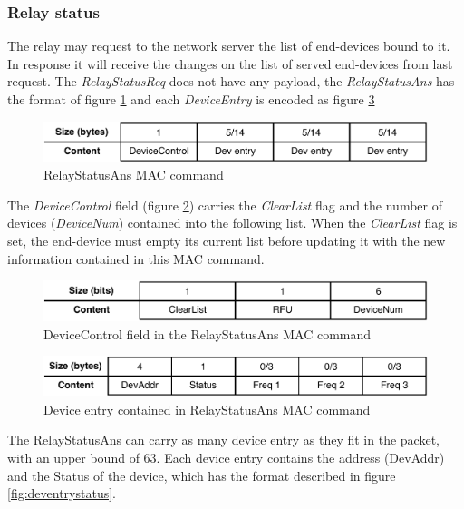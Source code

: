 \subsubsection{Relay status}
The relay may request to the network server the list of end-devices bound to it. In response it will receive the changes on the list of served end-devices from last request.
The \emph{RelayStatusReq} does not have any payload, the \emph{RelayStatusAns} has the format of figure \ref{fig:relaystatusans} and each \emph{DeviceEntry} is encoded as figure \ref{fig:deventry}

\begin{figure}[!h]
\centering
\includegraphics[width=\textwidth]{img/commands/RelayStatusAns}
\caption{RelayStatusAns MAC command}
\label{fig:relaystatusans}
\end{figure}
The \emph{DeviceControl} field (figure \ref{fig:devcontrol}) carries the \emph{ClearList} flag and the number of devices (\emph{DeviceNum}) contained into the following list.  When the \emph{ClearList} flag is set, the end-device must empty its current list before updating it with the new information contained in this MAC command.

\begin{figure}[!h]
\centering
\includegraphics[width=\textwidth]{img/commands/DeviceControl}
\caption{DeviceControl field in the RelayStatusAns MAC command}
\label{fig:devcontrol}
\end{figure}

\begin{figure}[!h]
\centering
\includegraphics[width=\textwidth]{img/commands/DevEntry}
\caption{Device entry contained in RelayStatusAns MAC command}
\label{fig:deventry}
\end{figure}
The RelayStatusAns can carry as many device entry as they fit in the packet, with an upper bound of 63. Each device entry contains the address (DevAddr) and the Status of the device, which has the format described in figure \ref{fig:deventrystatus}.

